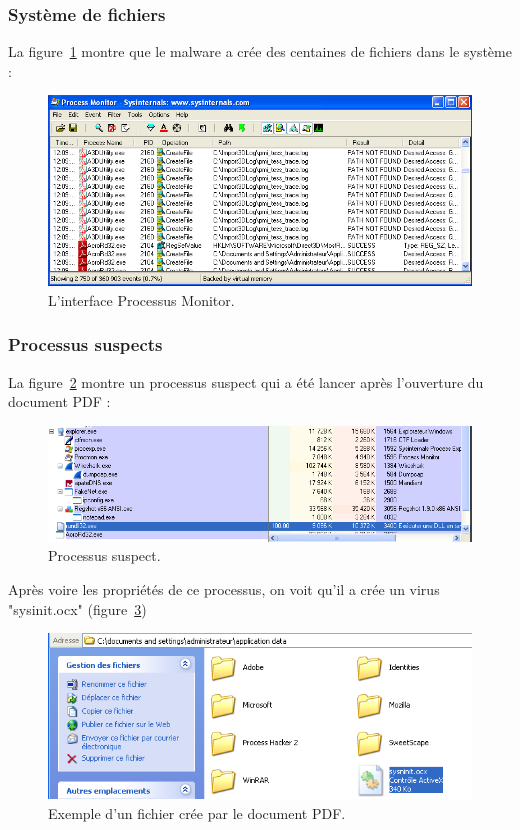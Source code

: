 \subsubsection*{Système de fichiers}
La figure~\ref{fig :anal12} montre que le malware a crée des centaines de fichiers dans le système :
\begin{figure}[H]
\begin{center}
\includegraphics[scale=0.7]{Figures/anal12.png}
\caption{L'interface Processus Monitor.}
\label{fig :anal12} 
\end{center}
\end{figure}
\subsubsection*{Processus suspects}
La figure~\ref{fig :anal7} montre un processus suspect qui a été lancer après l'ouverture du document PDF :
\begin{figure}[H]
\begin{center}
\includegraphics[scale=0.7]{Figures/anal7.png}
\caption{Processus suspect.}
\label{fig :anal7} 
\end{center}
\end{figure}

Après voire les propriétés de ce processus, on voit qu'il a crée un virus "sysinit.ocx" (figure~\ref{fig :anal8})
\begin{figure}[H]
\begin{center}
\includegraphics[scale=0.7]{Figures/anal8.png}
\caption{Exemple d'un fichier crée par le document PDF.}
\label{fig :anal8} 
\end{center}
\end{figure}

